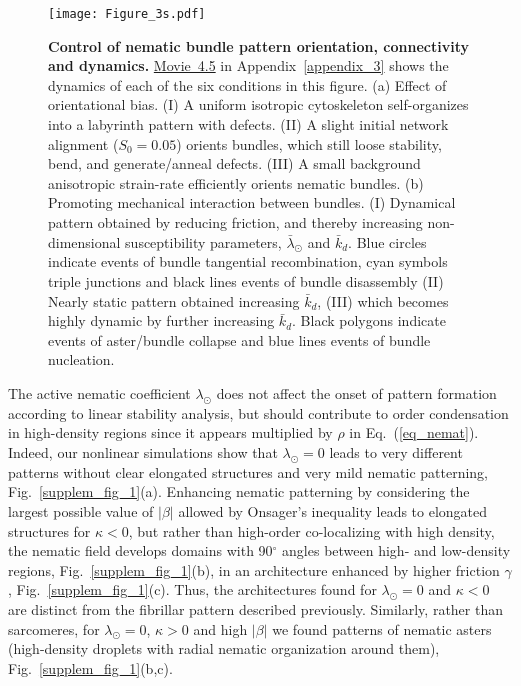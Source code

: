 \begin{figure}
	\centering
	\texttt{[image: Figure\_3s.pdf]}
	\caption{{\bf Control of nematic bundle pattern orientation, connectivity and dynamics.} \href{https://github.com/waleedmirzaPhD/movies_thesis.git}{Movie~4.5} in Appendix~\ref{appendix_3} shows the dynamics of each of the six conditions in this figure. (a) Effect of orientational bias. (I) A uniform isotropic cytoskeleton self-organizes into a labyrinth pattern with defects. (II) A slight initial network alignment ($S_0 =0.05$) orients bundles, which still loose stability, bend, and generate/anneal defects. (III) A small background anisotropic strain-rate efficiently orients nematic bundles. (b) Promoting mechanical interaction between bundles. (I) Dynamical pattern obtained by reducing friction, and thereby increasing non-dimensional susceptibility parameters, $\bar{\lambda}_\odot$ and $\bar{k}_d$. Blue circles indicate events of bundle tangential recombination, cyan symbols triple junctions and black lines events of bundle disassembly (II) Nearly static pattern obtained increasing $\bar{k}_d$, (III) which becomes highly dynamic by further increasing $\bar{k}_d$. Black polygons indicate events of aster/bundle collapse and blue lines events of bundle nucleation.}   
	\label{fig4.3}
\end{figure} 


The active nematic coefficient $\lambda_\odot$ does not affect the onset of pattern formation according to linear stability analysis, but should contribute to order condensation in high-density regions since it appears multiplied by $\rho$ in Eq.~(\ref{eq_nemat}). Indeed, our nonlinear simulations show that $\lambda_\odot=0$ leads to very different patterns without clear elongated structures and very mild nematic patterning, Fig.~\ref{supplem_fig_1}(a). Enhancing nematic patterning by considering the largest possible value of $\vert \beta \vert$ allowed by Onsager's inequality leads to elongated structures for $\kappa<0$, but rather than high-order co-localizing with high density, the nematic field develops domains with 90$^\circ$ angles between high- and low-density regions, Fig.~\ref{supplem_fig_1}(b), in an architecture enhanced by higher friction $\gamma$, Fig.~\ref{supplem_fig_1}(c). Thus, the architectures found for $\lambda_\odot=0$ and $\kappa<0$ are distinct from the fibrillar pattern described previously. Similarly, rather than sarcomeres, for $\lambda_\odot=0$, $\kappa>0$ and high $\vert \beta \vert$ we found patterns of nematic asters (high-density droplets with radial  nematic organization around them), Fig.~\ref{supplem_fig_1}(b,c). 


